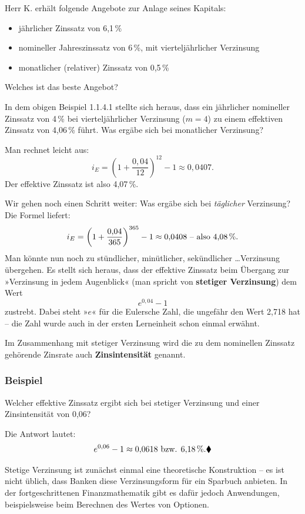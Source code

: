 \begin{graukasten}
  Herr K. erhält folgende Angebote zur Anlage seines Kapitals:
  \begin{itemize}
    \item jährlicher Zinssatz von 6{,}1\,\%
    \item nomineller Jahreszinssatz von 6\,\%, mit vierteljährlicher Verzinsung
    \item monatlicher (relativer) Zinssatz von 0{,}5\,\%
  \end{itemize}
  Welches ist das beste Angebot?
\end{graukasten}

In dem obigen Beispiel 1.1.4.1 stellte sich heraus, dass ein jährlicher nomineller Zinssatz von 4\,\% bei vierteljährlicher Verzinsung ($m = 4$) zu einem effektiven Zinssatz von 4{,}06\,\% führt. Was ergäbe sich bei monatlicher Verzinsung?

Man rechnet leicht aus:
\[ i_E = \left(1 + \frac{0{,}04}{12}\right)^{12} - 1 \approx 0{,}0407 . \]
Der effektive Zinssatz ist also 4{,}07\,\%.

Wir gehen noch einen Schritt weiter: Was ergäbe sich bei \emph{täglicher} Verzinsung? Die Formel liefert:
\[ i_E = \left(1 + \frac{0{,}04}{365}\right)^{365} - 1 \approx 0{,}0408 \text{ -- also 4{,}08\,\%.} \]
Man könnte nun noch zu stündlicher, minütlicher, sekündlicher \ldots Verzinsung übergehen. Es stellt sich heraus, dass der effektive Zinssatz beim Übergang zur »Verzinsung in jedem Augenblick« (man spricht von \textbf{stetiger Verzinsung}) dem Wert
\[ e^{0{,}04} - 1 \]
zustrebt. Dabei steht »$e$« für die Eulersche Zahl, die ungefähr den Wert 2{,}718 hat -- die Zahl wurde auch in der ersten Lerneinheit schon einmal erwähnt.

Im Zusammenhang mit stetiger Verzinsung wird die zu dem nominellen Zinssatz gehörende Zinsrate auch \textbf{Zinsintensität} genannt.

\subsubsection{Beispiel}

Welcher effektive Zinssatz ergibt sich bei stetiger Verzinsung und einer Zinsintensität von 0{,}06?

Die Antwort lautet:
\[ e^{0{,}06} - 1 \approx 0{,}0618 \text{ bzw. } 6{,}18\,\% .\beispielende \]

Stetige Verzinsung ist zunächst einmal eine theoretische Konstruktion -- es ist nicht üblich, dass Banken diese Verzinsungsform für ein Sparbuch anbieten. In der fortgeschrittenen Finanzmathematik gibt es dafür jedoch Anwendungen, beispielsweise beim Berechnen des Wertes von Optionen.
